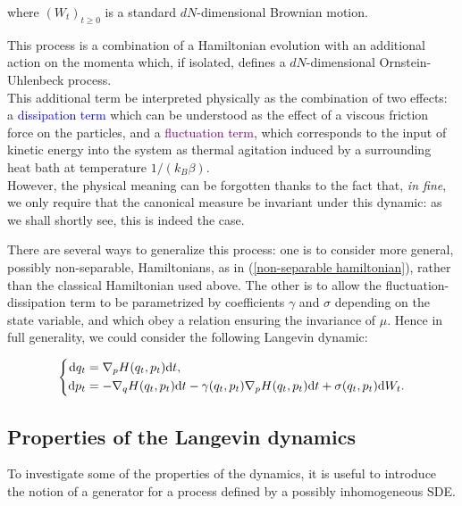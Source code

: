 where $(W_t)_{t\geq 0}$ is a standard $dN$-dimensional Brownian motion.

This process is a combination of a Hamiltonian evolution with an additional action on the momenta which, if isolated, defines a $dN$-dimensional Ornstein-Uhlenbeck process.\\
This additional term be interpreted physically as the combination of two effects: a \textcolor{blue}{dissipation term} which can be understood as the effect of a viscous friction force on the particles, and a \textcolor{purple}{fluctuation term}, which corresponds to the input of kinetic energy into the system as thermal agitation induced by a surrounding heat bath at temperature $1/(k_B\beta)$.\\
However, the physical meaning can be forgotten thanks to the fact that, \textit{in fine}, we only require that the canonical measure be invariant under this dynamic: as we shall shortly see, this is indeed the case.

\begin{remark}
    There are several ways to generalize this process: one is to consider more general, possibly non-separable, Hamiltonians, as in (\ref{non-separable hamiltonian}), rather than the classical Hamiltonian used above.
    The other is to allow the fluctuation-dissipation term to be parametrized by coefficients $\gamma$ and $\sigma$ depending on the state variable, and which obey a relation ensuring the invariance of $\mu$.
    Hence in full generality, we could consider the following Langevin dynamic:
    
    \begin{equation}
        \label{general Langevin}
        \left\{\begin{aligned}
            \text dq_t &=\nabla_p H(q_t,p_t)\text{d}t,\\
            \text dp_t &= -\nabla_q H(q_t,p_t)\text{d}t -\gamma(q_t,p_t)\nabla_pH(q_t,p_t)\text{d}t+\sigma(q_t,p_t)\text dW_t.
        \end{aligned}\right.
    \end{equation}
\end{remark}



\subsection{Properties of the Langevin dynamics}

To investigate some of the properties of the dynamics, it is useful to introduce the notion of a generator for a process defined by a possibly inhomogeneous SDE.

